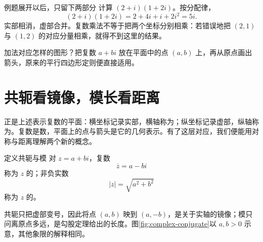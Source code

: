 \documentclass[a4paper,12pt,twoside,openany,fontset=none]{ctexbook}
\newcounter{definition}[chapter]
\newenvironment{definition}[1][]{\begin{defBox}{定义}{#1}}{\end{defBox}}
\newcounter{example}[chapter]
\newenvironment{example}[1][]{\begin{exBox}{例题}{#1}}{\end{exBox}}
\numberwithin{equation}{chapter}
\begin{document}
\begin{example}[展开以后，只留下两部分]
计算 $(2+i)(1+2i)$。按分配律，
\[
    (2+i)(1+2i)=2+4i+i+2i^2=5i.
\]
实部相消，虚部合并。复数乘法不等于把两个坐标分别相乘：若错误地把 $(2,1)$ 与 $(1,2)$ 的对应分量相乘，就得不到这里的结果。
\end{example}

加法对应怎样的图形？把复数 $a+bi$ 放在平面中的点 $(a,b)$ 上，再从原点画出箭头，原来的平行四边形定则便直接适用。


\section{共轭看镜像，模长看距离}

正是上述表示复数的平面：横坐标记录实部，横轴称为；纵坐标记录虚部，纵轴称为。复数是数，平面上的点与箭头是它的几何表示。有了这层对应，我们便能用对称与距离理解两个新的概念。

\begin{definition}[共轭与模]
对 $z=a+bi$，复数
\[
    \overline z=a-bi
\]
称为 $z$ 的\textbf{}；非负实数
\[
    |z|=\sqrt{a^2+b^2}
\]
称为 $z$ 的\textbf{}。
\end{definition}

共轭只把虚部变号，因此将点 $(a,b)$ 映到 $(a,-b)$，是关于实轴的镜像；模只问离原点多远，是勾股定理给出的长度。图\ref{fig:complex-conjugate}以 $a,b>0$ 示意，其他象限的解释相同。
\end{document}
